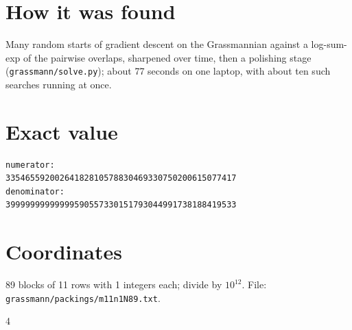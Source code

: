 \documentclass[11pt,a4paper]{article}
\begin{document}
\section{How it was found}
Many random starts of gradient descent on the Grassmannian against a log-sum-exp of the pairwise overlaps, sharpened over time, then a polishing stage (\texttt{grassmann/solve.py}); about 77 seconds on one laptop, with about ten such searches running at once.


\appendix
\section{Exact value}
{\small
\begin{verbatim}
numerator:
33546559200264182810578830469330750200615077417
denominator:
39999999999999590557330151793044991738188419533
\end{verbatim}}

\section{Coordinates}
89 blocks of 11 rows with 1 integers each; divide by $10^{12}$. File: \texttt{grassmann/packings/m11n1N89.txt}.
{\tiny
\begin{multicols}{4}
\end{multicols}}
\end{document}
